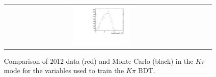 \begin{figure}
\begin{tabular}{ccc}
\includegraphics[width=0.3\textwidth]{ANA_resources/Plots/Monte_carlo/data_vs_MC/Kpi/log10(KstarPi_PT)_2012.pdf} & & \\
\end{tabular}
\caption{Comparison of 2012 data (red) and Monte Carlo (black) in the $K\pi$ mode for the variables used to train the $K\pi$ BDT.}
\label{fig:data_vs_MC_Kpi_2012}
\end{figure}
